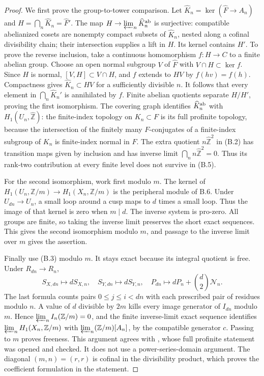 \begin{proof}
We first prove the group-to-tower comparison. Let
\(\widehat K_n=\ker(\widehat F\to A_n)\) and
\(H=\bigcap_n\widehat K_n=\widehat F'\).
The map \(H\to\varprojlim_n\widehat K_n^{\rm ab}\) is surjective:
compatible abelianized cosets are nonempty compact subsets of
\(\widehat K_n\), nested along a cofinal divisibility chain; their
intersection supplies a lift in \(H\).
Its kernel contains \(H'\). To prove the reverse inclusion, take a
continuous homomorphism \(f:H\to C\) to a finite abelian group. Choose
an open normal subgroup \(V\) of \(\widehat F\) with
\(V\cap H\subset\ker f\). Since \(H\) is normal,
\([V,H]\subset V\cap H\), and \(f\) extends to
\(HV\) by \(f(hv)=f(h)\). Compactness gives
\(\widehat K_n\subset HV\) for a sufficiently divisible \(n\).
It follows that every element in
\(\bigcap_n\widehat K_n'\) is annihilated by \(f\). Finite abelian
quotients separate \(H/H'\), proving the first isomorphism.
The covering graph identifies
\(\widehat K_n^{\rm ab}\) with \(H_1(U_n,\widehat{\mathbb Z})\):
the finite-index topology on \(K_n\subset F\) is its full profinite
topology, because the intersection of the finitely many \(F\)-conjugates
of a finite-index subgroup of \(K_n\) is finite-index normal in \(F\).
The extra quotient \(n\widehat{\mathbb Z}^2\) in (B.2) has transition
maps given by inclusion and has inverse limit
\(\bigcap_n n\widehat{\mathbb Z}^2=0\). Thus its rank-two contribution
at every finite level does not survive in (B.5).

For the second isomorphism, work first modulo \(m\).
The kernel of \(H_1(U_n,\mathbb Z/m)\to H_1(X_n,\mathbb Z/m)\)
is the peripheral module of B.6. Under \(U_{dn}\to U_n\), a small
loop around a cusp maps to \(d\) times a small loop. Thus the image of
that kernel is zero when \(m\mid d\). The inverse system is pro-zero.
All groups are finite, so taking the inverse limit preserves the short
exact sequences. This gives the second isomorphism modulo \(m\),
and passage to the inverse limit over \(m\) gives the assertion.

Finally use (B.3) modulo \(m\). It stays exact because its integral
quotient is free. Under \(R_{dn}\to R_n\),
\[
 S_{X,dn}\mapsto dS_{X,n},\quad
 S_{Y,dn}\mapsto dS_{Y,n},\quad
 P_{dn}\mapsto dP_n+\binom d2\mathcal N_n.
\]
The last formula counts pairs \(0\le j\le i<dn\) with each prescribed
pair of residues modulo \(n\). A value of \(d\) divisible by \(2m\)
kills every image generator of \(I_{dn}\) modulo \(m\).
Hence \(\varprojlim_n I_n(\mathbb Z/m)=0\), and the finite inverse-limit
exact sequence identifies \(\varprojlim_n H_1(X_n,\mathbb Z/m)\)
with \(\varprojlim_n(\mathbb Z/m)[A_n]\), by the compatible generator
\(c\). Passing to \(m\) proves freeness. This argument agrees with
\cite[Theorem 6.1]{Otsubo2016}, whose full profinite statement was
opened and checked. It does not use a power-series-domain argument.
The diagonal \((m,n)=(r,r)\) is cofinal in the divisibility product,
which proves the coefficient formulation in the statement.
\end{proof}


